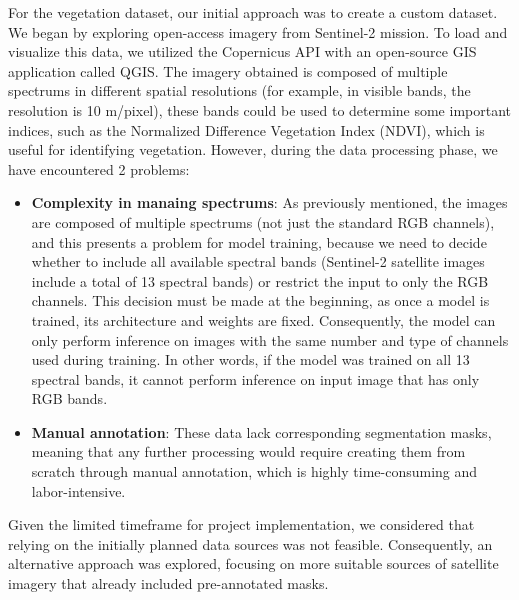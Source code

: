 For the vegetation dataset, our initial approach was to create a custom dataset. We began by exploring open-access imagery from Sentinel-2 mission. To load and visualize this data, we utilized the Copernicus API with an open-source GIS application called QGIS. The imagery obtained is composed of multiple spectrums in different
spatial resolutions (for example, in visible bands, the resolution is 10 m/pixel), these bands could be used to determine some important indices, such as the Normalized Difference Vegetation Index (NDVI), which is useful for identifying vegetation. However, during the data processing phase, we have encountered 2 problems:\\

\begin{itemize}
    \item \textbf{Complexity in manaing spectrums}: As previously mentioned, the images are composed of multiple spectrums (not just the standard RGB channels), and this presents a problem for model training, because we need to decide whether to include all available spectral bands (Sentinel-2 satellite images include a total of 13 spectral bands) or restrict the input to only the RGB channels. This decision must be made at the beginning, as once a model is trained, its architecture and weights are fixed. Consequently, the model can only perform inference on images with the same number and type of channels used during training. In other words, if the model was trained on all 13 spectral bands, it cannot perform inference on input image that has only RGB bands.\\ 
    \item \textbf{Manual annotation}: These data lack corresponding segmentation masks, meaning that any further processing would require creating them from scratch through manual annotation, which is highly time-consuming and labor-intensive.
    


\end{itemize}
Given the limited timeframe for project implementation, we considered that relying on the initially planned data sources was not feasible. Consequently, an alternative approach was explored, focusing on more suitable sources of satellite imagery that already included pre-annotated masks.
